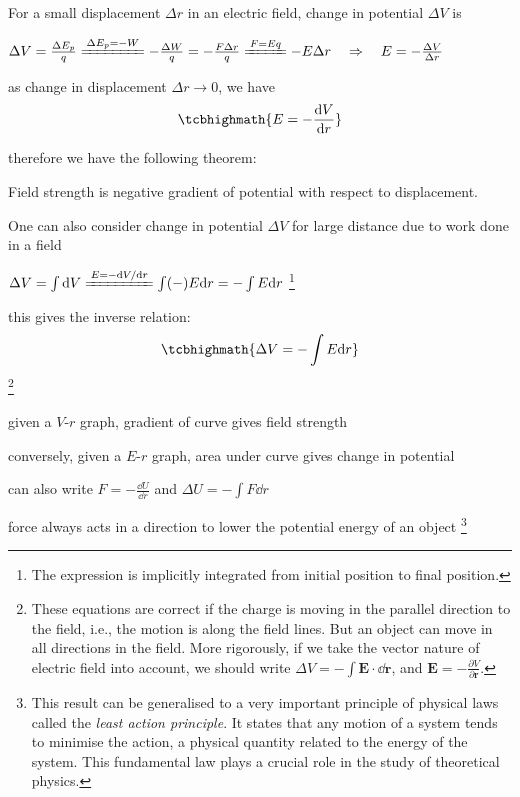 For a small displacement $\Delta r$ in an electric field, change in potential $\Delta V$ is

{

\centering

$\Delta V = \frac{\Delta E_p}{q} \xlongequal{\Delta E_p=-W} - \frac{\Delta W}{q} = - \frac{F \Delta r}{q} \xlongequal{F=Eq} - E \Delta r \RA E = - \frac{\Delta V}{\Delta r}$

}

\eqyskip as change in displacement $\Delta r \to 0$, we have $$\tcbhighmath{E = - \frac{\dd V}{\dd r}}$$

therefore we have the following theorem:

\begin{ilight}
	\centering Field strength is negative gradient of potential with respect to displacement.
\end{ilight}


One can also consider change in potential $\Delta V$ for large distance due to work done in a field

{
	
\centering

$\Delta V= \int \dd V \xlongequal{E = -\dd V/\dd r}  \int (-)E \dd r =  -\int E \dd r$
\footnote{The expression is implicitly integrated from initial position to final position.}

}

\eqyskip this gives the inverse relation: $$\tcbhighmath{\Delta V = -\int E \dd r}$$
\footnote{These equations are correct if the charge is moving in the parallel direction to the field, i.e., the motion is along the field lines. But an object can move in all directions in the field. More rigorously, if we take the vector nature of electric field into account, we should write $\Delta V = - \int \mathbf{E}\cdot\dd\mathbf{r}$, and $\mathbf{E} = - \frac{\partial V}{\partial \mathbf{r}}$. \piste}

\cmt given a $V$-$r$ graph, gradient of curve gives field strength

conversely, given a $E$-$r$ graph, area under curve gives change in potential

\cmt can also write $F = - \frac{\dd U}{\dd r}$ and $\Delta U = -\int F \dd r$

force always acts in a direction to lower the potential energy of an object
\footnote{This result can be generalised to a very important principle of physical laws called the \emph{least action principle}. It states that any motion of a system tends to minimise the action, a physical quantity related to the energy of the system. This fundamental law plays a crucial role in the study of theoretical physics. \piste}

